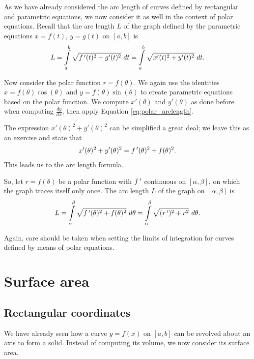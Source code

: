 As we have already considered the arc length of curves defined by rectangular and parametric equations, we now consider it as well in the context of polar equations. Recall that the arc length $L$ of the graph defined by the parametric equations $x=f(t)$, $y=g(t)$ on $[a,b]$ is
\begin{equation}L = \ds\int\limits_a^b \sqrt{\fp(t)^2 + g'(t)^2}\ dt = \ds\int\limits_a^b \sqrt{x'(t)^2+y'(t)^2}\ dt.\label{eq:polar_arclength}\end{equation}

Now consider the polar function $r=f(\theta)$. We again use the identities $x=f(\theta)\cos(\theta)$ and $y=f(\theta)\sin(\theta)$ to create parametric equations based on the polar function. We compute $x'(\theta)$ and $y'(\theta)$ as done before when computing $\frac{dy}{dx}$, then apply Equation \eqref{eq:polar_arclength}.

The expression $x'(\theta)^2+y'(\theta)^2$ can be simplified a great deal; we leave this as an exercise and state that $$x'(\theta)^2+y'(\theta)^2 = f\,'(\theta)^2+f(\theta)^2.$$ This leads us to the  arc length formula.

So, let  $r=f(\theta)$ be a polar function with $f\,'$ continuous on $[\alpha,\beta]$, on which the graph traces itself only once. The arc length $L$ of the graph on $[\alpha,\beta]$ is
\begin{equation}
L = \displaystyle\int\limits_\alpha^\beta \sqrt{f\,'(\theta)^2+f(\theta)^2}\ d\theta = \displaystyle\int\limits_\alpha^\beta\sqrt{(r\,')^2+ r^2}\ d\theta.
\label{thm:polar_arclength}
\end{equation}

Again, care should be taken when setting the limits of integration for curves defined by means of polar equations.


\section{Surface area}
\label{sec:mantelopp}
\subsection{Rectangular coordinates}
\checkoddpage
{}
We have already seen how a curve $y=f(x)$ on $[a,b]$ can be revolved about an axis to form a solid. Instead of computing its volume, we now consider its surface area.

